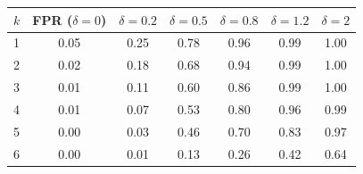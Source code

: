 \begin{tabular}{lcccccc}
\toprule
$k$ & FPR ($\delta=0$) & $\delta=0.2$ & $\delta=0.5$ & $\delta=0.8$ & $\delta=1.2$ & $\delta=2$ \\
\midrule
1 & 0.05 & 0.25 & 0.78 & 0.96 & 0.99 & 1.00 \\
2 & 0.02 & 0.18 & 0.68 & 0.94 & 0.99 & 1.00 \\
3 & 0.01 & 0.11 & 0.60 & 0.86 & 0.99 & 1.00 \\
4 & 0.01 & 0.07 & 0.53 & 0.80 & 0.96 & 0.99 \\
5 & 0.00 & 0.03 & 0.46 & 0.70 & 0.83 & 0.97 \\
6 & 0.00 & 0.01 & 0.13 & 0.26 & 0.42 & 0.64 \\
\bottomrule
\end{tabular}
